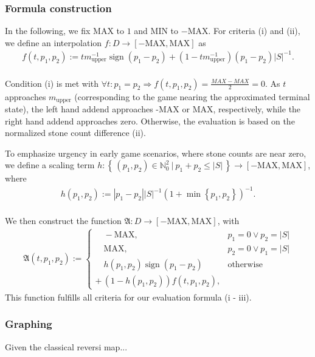 \documentclass[article,fleqn,12pt]{article}
\DeclareMathOperator{\sign}{sign}
\begin{document}
\subsubsection{Formula construction}
In the following, we fix MAX to \(1\) and MIN to \(-\text{MAX}\). For criteria (i) and (ii), we define an interpolation \(f: D \to \left[-\text{MAX},\text{MAX}\right]\) as
\begin{align*}
f(t, p_1, p_2) := tm_{\text{upper}}^{-1}\sign(p_1 - p_2) + \left(1 - tm_{\text{upper}}^{-1}\right)\left(p_1 - p_2\right)\left|S\right|^{-1}.
\end{align*} \\
Condition (i) is met with \(\forall t: p_1 = p_2 \Rightarrow f(t, p_1, p_2) = \frac{MAX - MAX}{2} = 0\). As \(t\) approaches \(m_{\text{upper}}\) (corresponding to the game nearing the approximated terminal state), the left hand addend approaches -MAX or MAX, respectively, while the right hand addend approaches zero. Otherwise, the evaluation is based on the normalized stone count difference (ii). 

To emphasize urgency in early game scenarios, where stone counts are near zero, we define a scaling term \(h: \left\{\, \left(p_1, p_2\right) \in \mathbb{N}_0^{2}\ |\ p_1 + p_2 \leq \left|S\right|\, \right\} \to \left[-\text{MAX},\text{MAX}\right]\), where
\begin{align*}
h(p_1, p_2) := \left|p_1 - p_2\right|\left|S\right|^{-1}\left(1 + \min\left\{ p_1, p_2 \right\}\right)^{-1}.
\end{align*} \\
We then construct the function \(\mathfrak{A}: D \to \left[-\text{MAX},\text{MAX}\right]\), with 
\begin{align*}
\mathfrak{A}(t, p_1, p_2) := \begin{cases}
\quad -\text{MAX},& p_1 = 0 \lor p_2 = \left|S\right| \\
\quad \text{MAX},& p_2 = 0 \lor p_1 = \left|S\right| \\
\quad h(p_1, p_2)\sign(p_1 - p_2) & \text{otherwise} \\[-0.2em]
+ \, (1 - h(p_1, p_2))f(t, p_1, p_2),&
\end{cases}
\end{align*}
This function fulfills all criteria for our evaluation formula (i - iii).

\subsubsection{Graphing}
Given the classical reversi map...
\end{document}

